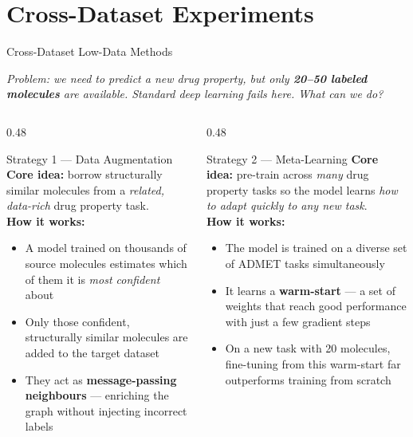 \documentclass[aspectratio=169]{beamer}
\begin{document}
\section{Cross-Dataset Experiments}

\begin{frame}[t]{Cross-Dataset Low-Data Methods}
\begin{center}
{\small\color{navyblue}\textit{Problem: we need to predict a new drug property, but only \textbf{20--50 labeled molecules} are available. Standard deep learning fails here. What can we do?}}
\end{center}
\vspace{4pt}
\begin{columns}[T]
\begin{column}{0.48\textwidth}
\begin{block}{Strategy 1 — Data Augmentation}
\footnotesize
\textbf{Core idea:} borrow structurally similar molecules from a \emph{related, data-rich} drug property task.\\[4pt]
\textbf{How it works:}
\begin{itemize}
  \item A model trained on thousands of source molecules estimates which of them it is \emph{most confident} about
  \item Only those confident, structurally similar molecules are added to the target dataset
  \item They act as \textbf{message-passing neighbours} — enriching the graph without injecting incorrect labels
\end{itemize}
\end{block}
\end{column}
\begin{column}{0.48\textwidth}
\begin{block}{Strategy 2 — Meta-Learning}
\footnotesize
\textbf{Core idea:} pre-train across \emph{many} drug property tasks so the model learns \textit{how to adapt quickly to any new task}.\\[4pt]
\textbf{How it works:}
\begin{itemize}
  \item The model is trained on a diverse set of ADMET tasks simultaneously
  \item It learns a \textbf{warm-start} — a set of weights that reach good performance with just a few gradient steps
  \item On a new task with 20 molecules, fine-tuning from this warm-start far outperforms training from scratch
\end{itemize}
\end{block}
\end{column}
\end{columns}
\end{frame}
\end{document}
